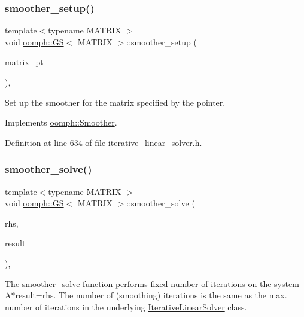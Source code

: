 \subsubsection{\texorpdfstring{smoother\+\_\+setup()}{smoother\_setup()}}
{\footnotesize\ttfamily template$<$typename M\+A\+T\+R\+IX $>$ \\
void \hyperlink{classoomph_1_1GS}{oomph\+::\+GS}$<$ M\+A\+T\+R\+IX $>$\+::smoother\+\_\+setup (\begin{DoxyParamCaption}\item[{\hyperlink{classoomph_1_1DoubleMatrixBase}{Double\+Matrix\+Base} $\ast$}]{matrix\+\_\+pt }\end{DoxyParamCaption})\hspace{0.3cm}{\ttfamily [inline]}, {\ttfamily [virtual]}}



Set up the smoother for the matrix specified by the pointer. 



Implements \hyperlink{classoomph_1_1Smoother_a6eb7009ab3bebcccc83062cbe980bf91}{oomph\+::\+Smoother}.



Definition at line 634 of file iterative\+\_\+linear\+\_\+solver.\+h.

\mbox{\label{classoomph_1_1GS_a8707c2bcc7fcaceca2fe93ac471ed1a2}} 
\subsubsection{\texorpdfstring{smoother\+\_\+solve()}{smoother\_solve()}}
{\footnotesize\ttfamily template$<$typename M\+A\+T\+R\+IX $>$ \\
void \hyperlink{classoomph_1_1GS}{oomph\+::\+GS}$<$ M\+A\+T\+R\+IX $>$\+::smoother\+\_\+solve (\begin{DoxyParamCaption}\item[{const \hyperlink{classoomph_1_1DoubleVector}{Double\+Vector} \&}]{rhs,  }\item[{\hyperlink{classoomph_1_1DoubleVector}{Double\+Vector} \&}]{result }\end{DoxyParamCaption})\hspace{0.3cm}{\ttfamily [inline]}, {\ttfamily [virtual]}}



The smoother\+\_\+solve function performs fixed number of iterations on the system A$\ast$result=rhs. The number of (smoothing) iterations is the same as the max. number of iterations in the underlying \hyperlink{classoomph_1_1IterativeLinearSolver}{Iterative\+Linear\+Solver} class. 



